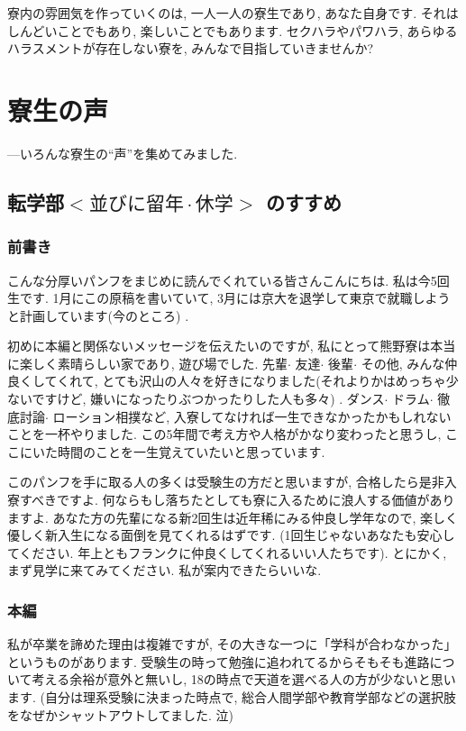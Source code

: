 \documentclass[10pt,b5jsbook,dvips,dvipdfmx,openany]{jsbook}
\theoremstyle{definition}
\begin{document}
		寮内の雰囲気を作っていくのは, 一人一人の寮生であり, あなた自身です. それはしんどいことでもあり, 楽しいことでもあります. セクハラやパワハラ, あらゆるハラスメントが存在しない寮を, みんなで目指していきませんか?



\newpage

\chapter{寮生の声}

---いろんな寮生の``声''を集めてみました.

	\section{転学部$ < 並びに留年 \cdot 休学 > $ のすすめ}
		\subsection{前書き}
		こんな分厚いパンフをまじめに読んでくれている皆さんこんにちは. 私は今5回生です. 1月にこの原稿を書いていて, 3月には京大を退学して東京で就職しようと計画しています(今のところ) .

		初めに本編と関係ないメッセージを伝えたいのですが, 私にとって熊野寮は本当に楽しく素晴らしい家であり, 遊び場でした. 先輩$ \cdot $ 友達$ \cdot $ 後輩$ \cdot $ その他, みんな仲良くしてくれて, とても沢山の人々を好きになりました(それよりかはめっちゃ少ないですけど, 嫌いになったりぶつかったりした人も多々) . ダンス$ \cdot $ ドラム$ \cdot $ 徹底討論$ \cdot $ ローション相撲など, 入寮してなければ一生できなかったかもしれないことを一杯やりました. この5年間で考え方や人格がかなり変わったと思うし, ここにいた時間のことを一生覚えていたいと思っています.

		このパンフを手に取る人の多くは受験生の方だと思いますが, 合格したら是非入寮すべきですよ. 何ならもし落ちたとしても寮に入るために浪人する価値がありますよ. あなた方の先輩になる新2回生は近年稀にみる仲良し学年なので, 楽しく優しく新入生になる面倒を見てくれるはずです. (1回生じゃないあなたも安心してください. 年上ともフランクに仲良くしてくれるいい人たちです).  %
とにかく, まず見学に来てみてください. 私が案内できたらいいな.

		\subsection{本編}
		私が卒業を諦めた理由は複雑ですが, その大きな一つに「学科が合わなかった」というものがあります. 受験生の時って勉強に追われてるからそもそも進路について考える余裕が意外と無いし, 18の時点で天道を選べる人の方が少ないと思います. (自分は理系受験に決まった時点で, 総合人間学部や教育学部などの選択肢をなぜかシャットアウトしてました. 泣)
\end{document}
